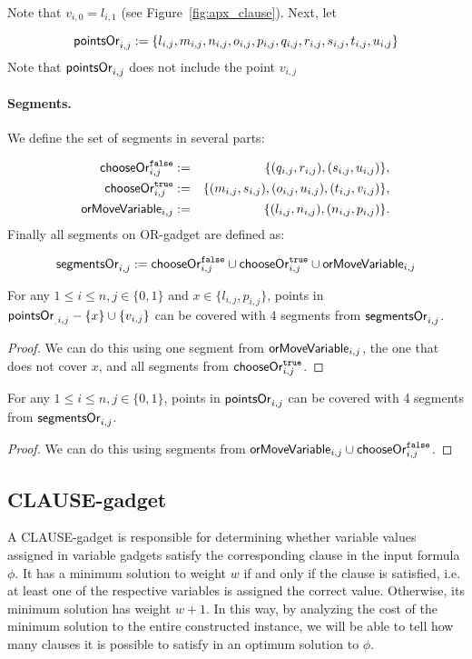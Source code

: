 Note that $v_{i, 0} = l_{i, 1}$ (see Figure~\ref{fig:apx_clause}).
Next, let

$$\mathsf{pointsOr}_{i,j} := 
 \{l_{i, j}, m_{i, j}, n_{i, j}, o_{i, j},
 p_{i, j}, q_{i, j}, r_{i, j}, s_{i, j}, t_{i, j}, u_{i, j} \}
 $$
Note that $\mathsf{pointsOr}_{i,j}$ does not include the point $v_{i,j}$
 
\paragraph{Segments.}

We define the set of segments in several parts:
 
 
\begin{eqnarray*}
\mathsf{chooseOr}^{\texttt{false}}_{i,j} &:=& \{ (q_{i, j}, r_{i, j}), (s_{i, j}, u_{i, j})\}, \\
\mathsf{chooseOr}^{\texttt{true}}_{i,j} &:=& \{ (m_{i, j}, s_{i, j}), (o_{i, j}, u_{i, j}), (t_{i, j}, v_{i, j}) \}, \\
\mathsf{orMoveVariable}_{i,j} &:=& \{ (l_{i, j}, n_{i, j}), (n_{i, j}, p_{i, j})\}.
\end{eqnarray*}
Finally all segments on OR-gadget are defined as:

$$\mathsf{segmentsOr}_{i,j} := 
  \mathsf{chooseOr}^{\texttt{false}}_{i,j} \cup \mathsf{chooseOr}^{\texttt{true}}_{i,j} \cup \mathsf{orMoveVariable}_{i,j}
$$


\begin{lemma}
\label{cover_or_true}
For any $1 \le i \le n, j \in \{0, 1\}$ and 
 $x \in \{l_{i, j}, p_{i, j}\}$, points in
${\mathsf{pointsOr}_{_,i, j} - \{ x\} \cup \{v_{i, j}\}}$
can be covered
with 4 segments from $\mathsf{segmentsOr}_{i,j}$.
\end{lemma}

\begin{proof}
We can do this using one segment from
$\mathsf{orMoveVariable}_{i,j}$, the one that does not cover $x$,
and all segments from $\mathsf{chooseOr}^{\texttt{true}}_{i,j}$.
\end{proof}

\begin{lemma}
\label{cover_or_false}
For any $1 \le i \le n, j \in \{0, 1\}$, points in
$\mathsf{pointsOr}_{i,j}$ can be covered
with 4 segments from $\mathsf{segmentsOr}_{i,j}$.
\end{lemma}

\begin{proof}
We can do this using segments from $\mathsf{orMoveVariable}_{i,j} \cup \mathsf{chooseOr}^{\texttt{false}}_{i,j}$.
\end{proof}


\subsection{CLAUSE-gadget}
A CLAUSE-gadget is responsible for determining whether
variable values assigned in variable gadgets
satisfy the corresponding clause in the input formula $\phi$.
It has a minimum solution to weight $w$
if and only if the clause is satisfied, i.e. at least one
of the respective variables is assigned the correct value.
Otherwise, its minimum solution has weight $w+1$.
In this way, by analyzing the cost of the minimum
solution to the entire constructed instance, we will be able to tell
how many clauses it is possible to satisfy
in an optimum solution to $\phi$.


